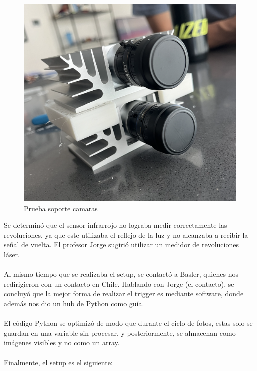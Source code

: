 \documentclass{article}
\begin{document}
\begin{figure}[H]
\begin{minipage}[c]{0.25\textwidth}
      \includegraphics[width=\textwidth]{FOTOS/C.png}
      \caption{Prueba soporte camaras}
    \end{minipage}
\end{figure}

\noindent Se determinó que el sensor infrarrojo no lograba medir correctamente las revoluciones, ya que este utilizaba el reflejo de la luz y no alcanzaba a recibir la señal de vuelta. El profesor Jorge sugirió utilizar un medidor de revoluciones láser.
\\ \\
Al mismo tiempo que se realizaba el setup, se contactó a Basler, quienes nos redirigieron con un contacto en Chile. Hablando con Jorge (el contacto), se concluyó que la mejor forma de realizar el trigger es mediante software, donde además nos dio un hub de Python como guía.
\\ \\
El código Python se optimizó de modo que durante el ciclo de fotos, estas solo se guardan en una variable sin procesar, y posteriormente, se almacenan como imágenes visibles y no como un array.
\\ \\
Finalmente, el setup es el siguiente:
\end{document}
